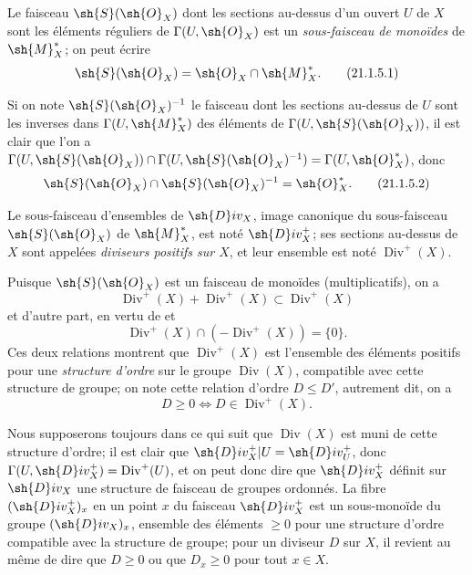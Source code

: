 \begin{env}[21.1.5]
\label{IV.21.1.5}
Le faisceau $\sh{S}(\sh{O}_X)$  dont les sections au-dessus d'un ouvert $U$ de $X$ sont les éléments réguliers de $\Gamma(U,\sh{O}_X)$ est un \emph{sous-faisceau de monoïdes} de $\sh{M}_X^*$; on peut écrire
\[
\label{IV.21.1.5.1}
  \sh{S}(\sh{O}_X)=\sh{O}_X\cap\sh{M}_X^*.
  \tag{21.1.5.1}
\]
\end{env}


Si on note $\sh{S}(\sh{O}_X)^{-1}$ le faisceau dont les sections au-dessus de $U$ sont les inverses dans $\Gamma(U,\sh{M}_X^*)$ des éléments de $\Gamma(U,\sh{S}(\sh{O}_X))$, il est clair que l'on a $\Gamma(U,\sh{S}(\sh{O}_X))\cap\Gamma(U,\sh{S}(\sh{O}_X)^{-1})=\Gamma(U,\sh{O}_X^*)$, donc
\[
\label{IV.21.1.5.2}
  \sh{S}(\sh{O}_X)\cap\sh{S}(\sh{O}_X)^{-1}=\sh{O}_X^*.
  \tag{21.1.5.2}
\]

\begin{definition}[21.1.6]
\label{IV.21.1.6}
Le sous-faisceau d'ensembles de $\sh{D}iv_X$, image canonique du sous-faisceau $\sh{S}(\sh{O}_X)$ de $\sh{M}_X^*$, est noté $\sh{D}iv_X^+$; ses sections au-dessus de $X$ sont appelées \emph{diviseurs positifs sur $X$}, et leur ensemble est noté $\operatorname{Div}^+(X)$.
\end{definition}

Puisque $\sh{S}(\sh{O}_X)$ est un faisceau de monoïdes (multiplicatifs), on a
\[
\label{IV.21.1.6.1}
  \operatorname{Div}^+(X)+\operatorname{Div}^+(X)\subset\operatorname{Div}^+(X)
  \tag{21.1.6.1}
\]
et d'autre part, en vertu de  et 
\[
\label{IV.21.1.6.2}
  \operatorname{Div}^+(X)\cap(-\operatorname{Div}^+(X))=\{0\}.
  \tag{21.1.6.2}
\]
Ces deux relations montrent que $\operatorname{Div}^+(X)$ est l'ensemble des éléments positifs pour une \emph{structure d'ordre} sur le groupe $\operatorname{Div}(X)$, compatible avec cette structure de groupe; on note cette relation d'ordre $D\leq D'$, autrement dit, on a
\[
\label{IV.21.1.6.3}
  D\geq0 \iff D\in\operatorname{Div}^+(X).
  \tag{21.1.6.3}
\]

Nous supposerons toujours dans ce qui suit que $\operatorname{Div}(X)$ est muni de cette structure d'ordre;
il est clair que $\sh{D}iv_X^+|U=\sh{D}iv_U^+$, donc $\Gamma(U,\sh{D}iv_X^+)=\operatorname{Div}^+(U)$, et on peut donc dire que $\sh{D}iv_X^+$ définit sur $\sh{D}iv_X$ une structure de faisceau de groupes ordonnés.
La fibre $(\sh{D}iv_X^+)_x$ en un point $x$ du faisceau $\sh{D}iv_X^+$ est un sous-monoïde du groupe $(\sh{D}iv_X)_x$, ensemble des éléments $\geq0$ pour une structure d'ordre compatible avec la structure de groupe;
pour un diviseur $D$ sur $X$, il revient au même de dire que $D\geq0$ ou que $D_x\geq0$ pour tout $x\in X$.

